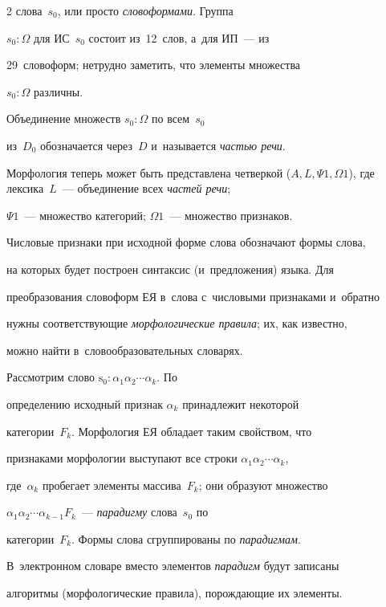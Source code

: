 \begin{multicols}{2}
слова~${s}_0$, или просто \textit{словоформами}. Группа 

${s}_0:\Omega$ для ИС~$s_0$ состоит из~12~слов, а~для ИП~--- из 

29~словоформ; нетрудно заметить, что элементы множества 

${s}_0:\Omega$ различны. 

    

    Объединение множеств ${s}_0:\Omega$ по всем~$s_0$ 

из~$D_0$ обозначается через~$D$ и~называется \textit{частью речи}. 

Морфология теперь может быть представлена чет\-вер\-кой ($A, L, \Psi1, 

\Omega1$), где лексика~$L$~--- объединение всех \textit{частей речи}; 

$\Psi1$~--- множество категорий; $\Omega1$~--- множество признаков.

    

    Числовые признаки при исходной форме слова обозначают формы слова, 

на которых будет построен синтаксис (и~предложения) языка. Для 

преобразования словоформ ЕЯ в~слова с~числовыми признаками и~обратно 

нужны соответствующие \textit{морфологические правила}; их, как известно, 

можно найти в~словообразовательных словарях.

    

     Рассмотрим слово $\mathrm{s}_0:\alpha_1\alpha_2\cdots \alpha_k$. По 

определению исходный признак $\alpha_k$ принадлежит некоторой 

категории~$F_k$. Морфология ЕЯ обладает таким свойством, что 

признаками морфологии выступают все строки $\alpha_1\alpha_2\cdots \alpha_k$, 

где~$\alpha_k$ пробегает элементы массива~$F_k$; они образуют множество 

$\alpha_1\alpha_2\cdots \alpha_{k-1}F_k$~--- \textit{парадигму} слова~${s}_0$ по 

категории~$F_k$. Формы слова сгруппированы по \textit{парадигмам}. 

В~электронном словаре вместо элементов \textit{парадигм} будут записаны 

алгоритмы (морфологические правила), порождающие их элементы.

     


\end{multicols}
